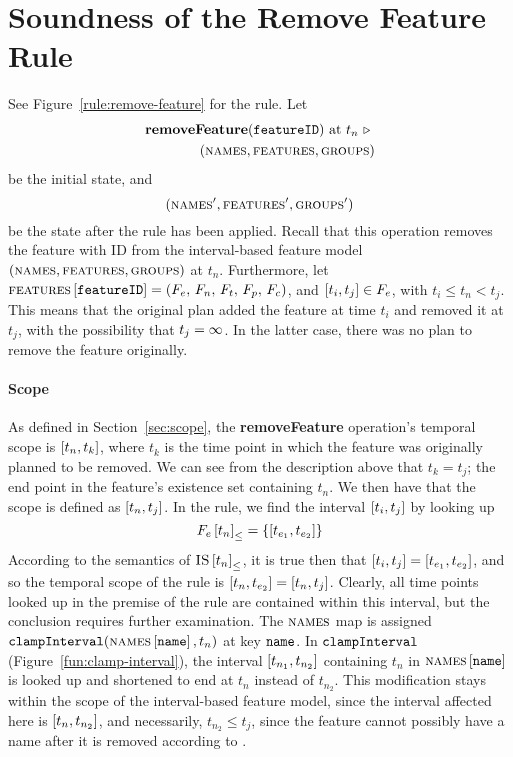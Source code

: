 \section{Soundness of the Remove Feature Rule}
\label{sec:soundness-of-the-remove-feature-rule}

See Figure~\vref{rule:remove-feature} for the  rule. 
Let 
\begin{equation*}
   \begin{split}
      \textbf{removeFeature}(\texttt{featureID})\text{ at } t_n
      \ \triangleright \  \\
   (\textsc{names}{}, \textsc{features}{}, \textsc{groups}{}{})
\end{split}
\end{equation*}
be the initial state, and
\[
   (\textsc{names}'{}, \textsc{features}'{}, \textsc{groups}{}'{})
\] be the state after the  rule has been applied. Recall that this operation removes the feature with ID  from the interval-based feature model $(\textsc{names}{}, \textsc{features}{}, \textsc{groups}{}{})$ at $t_n$. Furthermore, let $\textsc{features} \left[ \texttt{featureID} \right] = \left(F_e,\, F_n,\, F_t,\, F_p,\, F_c\right)$, and $\interval{t_i}{t_j} \in F_e$, with $t_i \leq t_n < t_j$. This means that the original plan added the feature at time $t_i$ and removed it at $t_j$, with the possibility that $t_j = \infty$. In the latter case, there was no plan to remove the feature originally.

\paragraph{Scope}
As defined in Section~\vref{sec:scope}, the \textbf{removeFeature} operation's temporal scope is $\interval{t_n}{t_k}$, where $t_k$ is the time point in which the feature was originally planned to be removed. We can see from the description above that $t_k = t_j$; the end point in the feature's existence set containing $t_n$. We then have that the scope is defined as $\interval{t_n}{t_j}$. In the rule, we find the interval $\interval{t_i}{t_j}$ by looking up
\begin{equation*}
   \containing{F_e}{t_n} = \set{\interval{t_{e_1}}{t_{e_2}}}
\end{equation*}
   According to the semantics of ${\textsc{IS} \left[ t_n \right]}_{\leq}$, it is true then that $\interval{t_i}{t_j} = \interval{t_{e_1}}{t_{e_2}}$, and so the temporal scope of the rule is $\interval{t_n}{t_{e_2}} = \interval{t_n}{t_j}$. Clearly, all time points looked up in the premise of the rule are contained within this interval, but the conclusion requires further examination. The $\textsc{names}{}$ map is assigned $\texttt{clampInterval}(\textsc{names} \left[ \texttt{name} \right], t_n)$ at key $\texttt{name}$. In $\texttt{clampInterval}$ (Figure~\vref{fun:clamp-interval}), the interval $\interval{t_{n_1}}{t_{n_2}}$ containing $t_n$ in $\textsc{names} \left[ \texttt{name} \right]$ is looked up and shortened to end at $t_n$ instead of $t_{n_2}$. This modification stays within the scope of the interval-based feature model, since the interval affected here is $\interval{t_n}{t_{n_2}}$, and necessarily, $t_{n_2} \leq t_j$, since the feature cannot possibly have a name after it is removed according to . 

